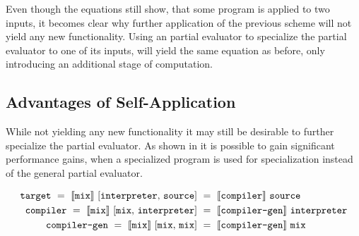 Even though the equations still show, that some program is applied to two inputs, it becomes clear why further application of the previous scheme will not yield any new functionality.
Using an partial evaluator to specialize the partial evaluator to one of its inputs, will yield the same equation as before, only introducing an additional stage of computation.


\subsection{Advantages of Self-Application}\label{sec:self-application}

While not yielding any new functionality it may still be desirable to further specialize the partial evaluator.
As shown in \citationneeded{} it is possible to gain significant performance gains, when a specialized program is used for specialization instead of the general partial evaluator.

\begin{align*}
  \mathtt{target}\ =\
  \llbracket \mathtt{mix} \rrbracket\ [\mathtt{interpreter},\, \mathtt{source}]\ &=\
  \llbracket \mathtt{compiler} \rrbracket\ \mathtt{source} \\
  \mathtt{compiler}\ =\
  \llbracket \mathtt{mix} \rrbracket\ [\mathtt{mix},\, \mathtt{interpreter}]\ &=\
  \llbracket \text{\texttt{compiler-gen}} \rrbracket\ \mathtt{interpreter} \\
  \text{\texttt{compiler-gen}}\ =\
  \llbracket \mathtt{mix} \rrbracket\ [\mathtt{mix},\, \mathtt{mix}]\ &=\
  \llbracket \text{\texttt{compiler-gen}} \rrbracket\ \mathtt{mix}
\end{align*}

